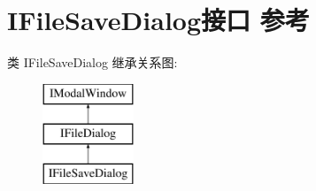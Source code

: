 \hypertarget{interface_i_file_save_dialog}{}\section{I\+File\+Save\+Dialog接口 参考}
\label{interface_i_file_save_dialog}
类 I\+File\+Save\+Dialog 继承关系图\+:\begin{figure}[H]
\begin{center}
\leavevmode
\includegraphics[height=3.000000cm]{interface_i_file_save_dialog}
\end{center}
\end{figure}
